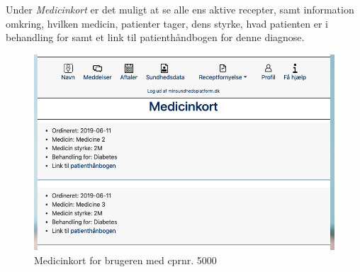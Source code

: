 \newpage
Under \textit{Medicinkort} er det muligt at se alle ens aktive recepter, samt information omkring, hvilken medicin, patienter tager, dens styrke, hvad patienten er i behandling for samt et link til patienthåndbogen for denne diagnose.
\begin{figure}[h!]
	\includegraphics[width=\linewidth]{Materials/Prototype/medicinkort}
	\caption{Medicinkort for brugeren med cprnr. 5000}
\end{figure}
